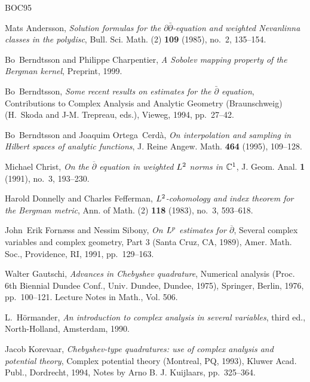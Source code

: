 \documentclass[12pt,twoside,final,psamsfonts]{amsart}
\theoremstyle{plain}
\theoremstyle{remark}
\theoremstyle{definition}
\begin{document}
\begin{thebibliography}{BOC95}

Mats Andersson, \emph{Solution formulas for the $\partial\bar\partial$-equation
  and weighted {N}evanlinna classes in the polydisc}, Bull. Sci. Math. (2)
  \textbf{109} (1985), no.~2, 135--154.

Bo~Berndtsson and Philippe Charpentier, \emph{A {S}obolev mapping property of
  the {B}ergman kernel}, Preprint, 1999.

Bo~Berndtsson, \emph{Some recent results on estimates for the {$\bar\partial$}
  equation}, Contributions to Complex Analysis and Analytic Geometry
  (Braunschweig) (H.~Skoda and J-M. Trepreau, eds.), Vieweg, 1994, pp.~27--42.

Bo~Berndtsson and Joaquim Ortega~Cerd{\`a}, \emph{On interpolation and sampling
  in {H}ilbert spaces of analytic functions}, J. Reine Angew. Math.
  \textbf{464} (1995), 109--128.

Michael Christ, \emph{On the $\overline\partial$ equation in weighted ${L}\sp
  2$ norms in {${\mathbb C}\sp 1$}}, J. Geom. Anal. \textbf{1} (1991), no.~3,
  193--230.

Harold Donnelly and Charles Fefferman, \emph{${L}\sp{2}$-cohomology and index
  theorem for the {B}ergman metric}, Ann. of Math. (2) \textbf{118} (1983),
  no.~3, 593--618.

John~Erik Forn{\ae}ss and Nessim Sibony, \emph{On ${L}\sp p$ estimates for
  $\overline\partial$}, Several complex variables and complex geometry, Part 3
  (Santa Cruz, CA, 1989), Amer. Math. Soc., Providence, RI, 1991, pp.~129--163.

Walter Gautschi, \emph{Advances in {C}hebyshev quadrature}, Numerical analysis
  (Proc. 6th Biennial Dundee Conf., Univ. Dundee, Dundee, 1975), Springer,
  Berlin, 1976, pp.~100--121. Lecture Notes in Math., Vol. 506.

L.~H{\"o}rmander, \emph{An introduction to complex analysis in several
  variables}, third ed., North-Holland, Amsterdam, 1990.

Jacob Korevaar, \emph{Chebyshev-type quadratures: use of complex analysis and
  potential theory}, Complex potential theory (Montreal, PQ, 1993), Kluwer
  Acad. Publ., Dordrecht, 1994, Notes by Arno B. J. Kuijlaars, pp.~325--364.


\end{thebibliography}
\end{document}
